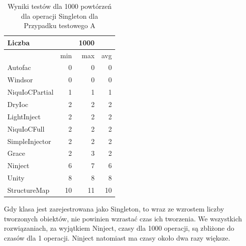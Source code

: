 \documentclass[12pt]{article}
\begin{document}
\begin{table}[H]
\captionsetup{belowskip=0pt,aboveskip=0pt}
\begin{center}
\begin{small}
	\begin{tabular}{ | l | r r r | }
    		\hline
Liczba & & 1000 & \\ \hline
 & min & max & avg \\ \hline
Autofac & 0 & 0 & 0 \\ \hline
Windsor & 0 & 0 & 0 \\ \hline
NiquIoCPartial & 1 & 1 & 1 \\ \hline
DryIoc & 2 & 2 & 2 \\ \hline
LightInject & 2 & 2 & 2 \\ \hline
NiquIoCFull & 2 & 2 & 2 \\ \hline
SimpleInjector & 2 & 2 & 2 \\ \hline
Grace & 2 & 3 & 2 \\ \hline
Ninject & 6 & 7 & 6 \\ \hline
Unity & 8 & 8 & 8 \\ \hline
StructureMap & 10 & 11 & 10 \\ \hline
  	\end{tabular}
\end{small}
\end{center}
\caption{Wyniki testów dla 1000 powtórzeń dla operacji Singleton dla Przypadku testowego A}
\label{TestCaseA_Singleton1000}
\end{table}
Gdy klasa jest zarejestrowana jako Singleton, to wraz ze wzrostem liczby tworzonych obiektów, nie powinien wzrastać czas ich tworzenia. We wszystkich rozwiązaniach, za wyjątkiem Ninject, czasy dla 1000 operacji, są zbliżone do czasów dla 1 operacji. Ninject natomiast ma czasy około dwa razy większe.
\end{document}
